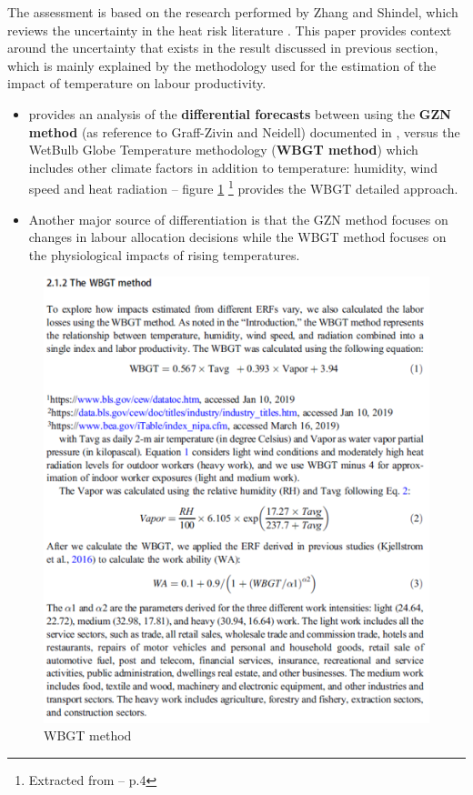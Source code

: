 \documentclass[a4paper,11pt]{extarticle} %
\theoremstyle{definition}
\begin{document}
The assessment is based on the research performed by Zhang and Shindel, which reviews the uncertainty in the heat risk literature \cite{ZhangAndShindell:2021}. This paper provides context around the uncertainty that exists in the result discussed in previous section, which is mainly explained by the methodology used for the estimation of the impact of temperature on labour productivity.
\begin{itemize}
    \item \cite{ZhangAndShindell:2021} provides an analysis of the \textbf{differential forecasts} between using the \textbf{GZN method} (as reference to Graff-Zivin and Neidell) documented in \cite{NeidellEtAl:2021}, versus the WetBulb Globe Temperature methodology (\textbf{WBGT method}) which includes other climate factors in addition to temperature: humidity, wind speed and heat radiation -- figure \ref{fig:WBGT} \footnote{Extracted from \cite{ZhangAndShindell:2021} -- p.4} provides the WBGT detailed approach.
    \item Another major source of differentiation is that the GZN method focuses on changes in labour allocation decisions while the WBGT method focuses on the physiological impacts of rising temperatures.
\end{itemize}
\begin{figure}[H]
    \centering
    \includegraphics{plots/WBGT.png}
    \caption{WBGT method}
    \label{fig:WBGT}
\end{figure}
\end{document}
